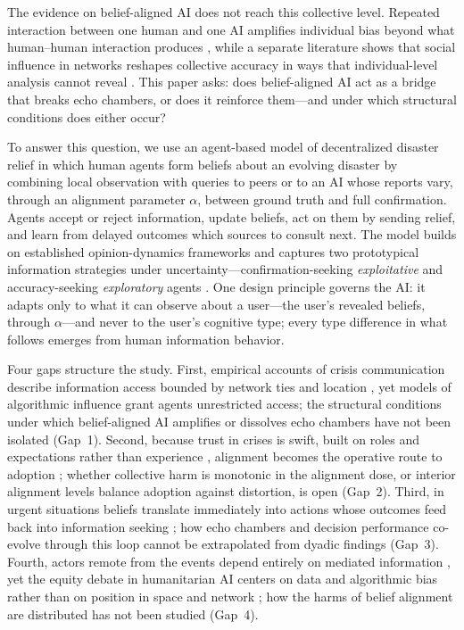 \documentclass[pdflatex,sn-nature]{sn-jnl}
\begin{document}
The evidence on belief-aligned AI does not reach this collective level. Repeated interaction between one human and one AI amplifies individual bias beyond what human--human interaction produces \citep{glickman2024human}, while a separate literature shows that social influence in networks reshapes collective accuracy in ways that individual-level analysis cannot reveal \citep{lorenz2011social,becker2017network}. This paper asks: does belief-aligned AI act as a bridge that breaks echo chambers, or does it reinforce them---and under which structural conditions does either occur?

To answer this question, we use an agent-based model of decentralized disaster relief in which human agents form beliefs about an evolving disaster by combining local observation with queries to peers or to an AI whose reports vary, through an alignment parameter $\alpha$, between ground truth and full confirmation. Agents accept or reject information, update beliefs, act on them by sending relief, and learn from delayed outcomes which sources to consult next. The model builds on established opinion-dynamics frameworks \citep{deffuant2000mixing,hegselmann2002opinion} and captures two prototypical information strategies under uncertainty---confirmation-seeking \emph{exploitative} and accuracy-seeking \emph{exploratory} agents \citep{march1991exploration}. One design principle governs the AI: it adapts only to what it can observe about a user---the user's revealed beliefs, through $\alpha$---and never to the user's cognitive type; every type difference in what follows emerges from human information behavior.

Four gaps structure the study. First, empirical accounts of crisis communication describe information access bounded by network ties and location \citep{pan2012crisis,holguin2012unique}, yet models of algorithmic influence grant agents unrestricted access; the structural conditions under which belief-aligned AI amplifies or dissolves echo chambers have not been isolated (Gap~1). Second, because trust in crises is swift, built on roles and expectations rather than experience \citep{tatham2010application}, alignment becomes the operative route to adoption \citep{glikson2020human,lee2004trust}; whether collective harm is monotonic in the alignment dose, or interior alignment levels balance adoption against distortion, is open (Gap~2). Third, in urgent situations beliefs translate immediately into actions whose outcomes feed back into information seeking \citep{gralla2016problem}; how echo chambers and decision performance co-evolve through this loop cannot be extrapolated from dyadic findings (Gap~3). Fourth, actors remote from the events depend entirely on mediated information \citep{holguin2012unique}, yet the equity debate in humanitarian AI centers on data and algorithmic bias rather than on position in space and network \citep{coleman2024weaving}; how the harms of belief alignment are distributed has not been studied (Gap~4).
\end{document}
